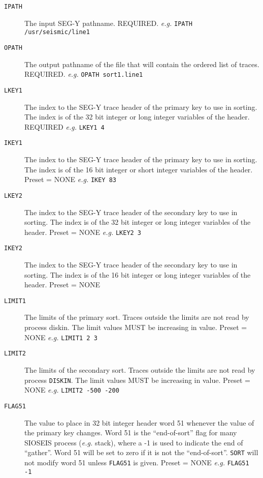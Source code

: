 \begin{description}

\item[\texttt{IPATH}] The input SEG-Y pathname.
          REQUIRED.      \textit{e.g.}  \texttt{IPATH /usr/seismic/line1}

\item[\texttt{OPATH}] The output pathname of the file that will contain the ordered
          list of traces.
          REQUIRED.      \textit{e.g.}  \texttt{OPATH sort1.line1}

\item[\texttt{LKEY1}] The index to the SEG-Y trace header of the primary key to use
          in sorting.  The index is of the 32 bit integer or long
          integer variables of the header.
          REQUIRED       \textit{e.g.}  \texttt{LKEY1 4}

\item[\texttt{IKEY1}] The index to the SEG-Y trace header of the primary key to use
          in sorting.  The index is of the 16 bit integer or short
          integer variables of the header.
          Preset = NONE  \textit{e.g.}  \texttt{IKEY 83}

\item[\texttt{LKEY2}] The index to the SEG-Y trace header of the secondary key to
          use in sorting.  The index is of the 32 bit integer or long
          integer variables of the header.
          Preset = NONE  \textit{e.g.}   \texttt{LKEY2 3}

\item[\texttt{IKEY2}] The index to the SEG-Y trace header of the secondary key to
          use in sorting.  The index is of the 16 bit integer or long
          integer variables of the header.
          Preset = NONE

\item[\texttt{LIMIT1}] The limits of the primary sort.  Traces outside the limits are
          not read by process diskin.  The limit values MUST be
          increasing in value.
          Preset = NONE  \textit{e.g.} \texttt{LIMIT1 2 3}

\item[\texttt{LIMIT2}] The limits of the secondary sort.  Traces outside the limits
    are not read by process \texttt{DISKIN}.  The limit values MUST be
          increasing in value.
          Preset = NONE   \textit{e.g.} \texttt{LIMIT2 -500 -200}

\item[\texttt{FLAG51}] The value to place in 32 bit integer header word 51 whenever
          the value of the primary key changes.  Word 51 is the
          ``end-of-sort'' flag for many SIOSEIS process (\textit{e.g.} stack),
          where a -1 is used to indicate the end of ``gather''.  Word 51
          will be set to zero if it is not the ``end-of-sort''.  \texttt{SORT} will
          not modify word 51 unless \texttt{FLAG51} is given.
          Preset = NONE  \textit{e.g.}  \texttt{FLAG51 -1}


\end{description}
